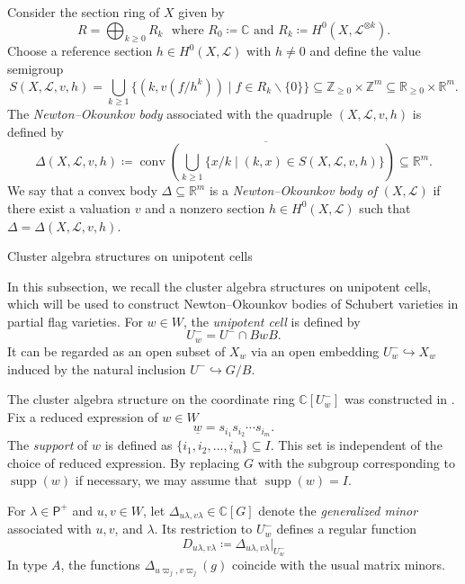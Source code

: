 \documentclass[11pt]{amsart}
\makeatletter
\def\subsection{\@startsection{subsection}{2}%
  \z@{-.8\linespacing\@plus-.3\linespacing}{.3\linespacing\@plus.2\linespacing}%
  {\normalfont\bfseries}}
\newcommand{\C}{\mathbb{C}}
\newcommand{\R}{\mathbb{R}}
\newcommand{\Z}{\mathbb{Z}}
\def\mcal{\mathcal}
\numberwithin{equation}{section}
\theoremstyle{plain}
\theoremstyle{definition}
\numberwithin{equation}{section}
\newcommand{\rxw}{\underline{w}}
\makeatother
\begin{document}
Consider the section ring of $X$ given by
$$
R = \bigoplus_{k \geq 0} R_k \,\, \mbox{ where $R_0 \coloneqq \C$ and $R_k \coloneqq H^0(X, \mcal{L}^{\otimes k})$}. 
$$
Choose a reference section $h \in H^0(X, \mathcal{L})$ with $h \neq 0$ and define the value semigroup 
\begin{equation}\label{equ_SR}
S(X, \mathcal{L},v,h) = \bigcup_{k \geq 1} \bigl\{ (k, v(f/h^k)) \mid f \in R_k \backslash \{0\} \bigr\}  \subseteq \Z_{\geq 0} \times \Z^m \subseteq \R_{\geq 0} \times \R^m. 
\end{equation}
The \emph{Newton--Okounkov body} associated with the quadruple $(X, \mathcal{L}, v, h)$ is defined by 
\begin{equation}\label{equ_Deltav}
\Delta(X, \mathcal{L}, v, h) \coloneqq \overline{\operatorname{conv} \left( \bigcup_{k \geq 1} \{ x / k \mid (k,x) \in S(X, \mathcal{L},v,h) \} \right) } \subseteq \R^m.
\end{equation}
We say that a convex body $\Delta \subseteq \mathbb{R}^m$ is a \emph{Newton--Okounkov body of} $(X, \mathcal{L})$ if there exist a valuation $v$ and a nonzero section $h \in H^0(X,\mathcal{L})$ such that $\Delta = \Delta(X, \mathcal{L}, v, h)$.



\subsection{Cluster algebra structures on unipotent cells}\label{subsec_clusunicell}

In this subsection, we recall the cluster algebra structures on unipotent cells, which will be used to construct Newton--Okounkov bodies of Schubert varieties in partial flag varieties. For $w \in W$, the \emph{unipotent cell} is defined by 
$$
U_w^- = U^- \cap BwB.
$$ 
It can be regarded as an open subset of $X_w$ via an open embedding $U^-_w \hookrightarrow X_w$ induced by the natural inclusion  $U^- \hookrightarrow G/B$. 

The cluster algebra structure on the coordinate ring $\C[U^-_w]$ was constructed in \cite{BFZ05, Williams13, GLS11, GY17, FO25}.  Fix a reduced expression of $w \in W$
$$
\rxw = s_{i_1} s_{i_2} \cdots s_{i_m}.
$$
The \emph{support} of $w$ is defined as $\{i_1, i_2, \ldots, i_m\} \subseteq I$. This set is independent of the choice of reduced expression. By replacing $G$ with the subgroup corresponding to $\operatorname{supp}(w)$ if necessary, we may assume that $\operatorname{supp}(w)=I$.

For $\lambda \in \mathsf{P}^+$ and $u,v \in W$, let $\Delta_{u \lambda, v \lambda} \in \C[G]$ denote the \emph{generalized minor} associated with $u,v$, and $\lambda$. Its restriction to $U_w^-$ defines a regular function
$$
D_{u \lambda, v \lambda} \coloneqq \Delta_{u \lambda, v \lambda} |_{U^-_w} 
$$
In type $A$, the functions $\Delta_{u \varpi_j, v \varpi_j}(g)$ coincide with the usual matrix minors. 
\end{document}
